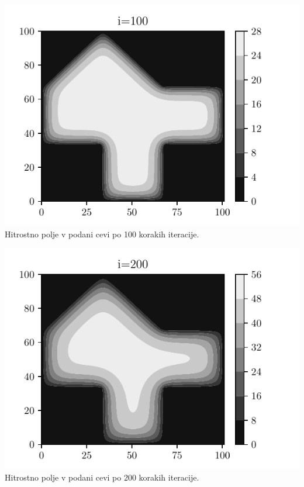 \begin{center}
    \begin{minipage}{0.45\textwidth}
        \centering
    \includegraphics[width=\textwidth]{../old/1-hiska_i100.pdf}
    {Hitrostno polje v podani cevi po 100 korakih iteracije.}
    \end{minipage}\hfill
    \begin{minipage}{0.45\textwidth}
        \centering
        \includegraphics[width=1\textwidth]{../old/1-hiska_i200.pdf}
    {Hitrostno polje v podani cevi po 200 korakih iteracije. }
    \end{minipage}


\end{center}
